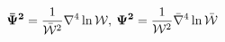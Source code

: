 \begin{equation} \label{Psi}
{\bf\bar\Psi^2} =\frac{1}{\bar{\cal W}^{2}}\nabla^{4}\ln{\cal W},\:
{\bf\Psi^2} =\frac{1}{ {\cal W}^{2}}\bar\nabla^{4}\ln\bar{\cal W}
\end{equation}

